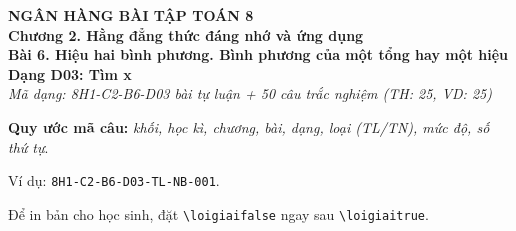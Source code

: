 \documentclass[12pt,a4paper]{article}
\newif\ifloigiai
\begin{document}
\begin{center}
{\Large\textbf{NGÂN HÀNG BÀI TẬP TOÁN 8}}\\[3pt]
\textbf{Chương 2. Hằng đẳng thức đáng nhớ và ứng dụng}\\[2pt]
\textbf{Bài 6. Hiệu hai bình phương. Bình phương của một tổng hay một hiệu}\\[2pt]
\textbf{Dạng D03: Tìm x}\\[2pt]
\textit{Mã dạng: 8H1-C2-B6-D03  bài tự luận + 50 câu trắc nghiệm \quad (TH: 25, VD: 25)}
\end{center}
\textbf{Quy ước mã câu:} \textit{khối, học kì, chương, bài, dạng, loại (TL/TN), mức độ, số thứ tự}.\par Ví dụ: \texttt{8H1-C2-B6-D03-TL-NB-001}.\par Để in bản cho học sinh, đặt \verb|\loigiaifalse| ngay sau \verb|\loigiaitrue|.
\end{document}
